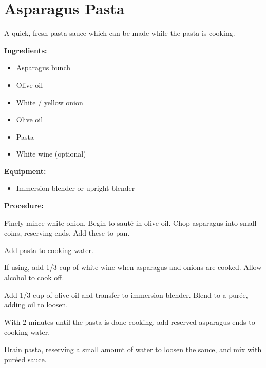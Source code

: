 \section{Asparagus Pasta} %
A quick, fresh pasta sauce which can be made while the pasta is cooking.

\begin{multicols}{2}\raggedcolumns
\textbf{Ingredients:}

\begin{itemize}
	\item Asparagus bunch
	\item Olive oil
	\item White / yellow onion
	\item Olive oil
	\item Pasta
	\item White wine (optional)
\end{itemize}


\textbf{Equipment:}
	\begin{itemize}
		\item Immersion blender or upright blender
	\end{itemize}

\columnbreak

\textbf{Procedure:}

Finely mince white onion. Begin to sauté in olive oil.
Chop asparagus into small coins, reserving ends. Add these to pan.

Add pasta to cooking water.

If using, add 1/3 cup of white wine when asparagus and onions are cooked. Allow alcohol to cook off.

Add 1/3 cup of olive oil and transfer to immersion blender. Blend to a purée, adding oil to loosen.

With 2 minutes until the pasta is done cooking, add reserved asparagus ends to cooking water.

Drain pasta, reserving a small amount of water to loosen the sauce, and mix with puréed sauce.

\end{multicols}
